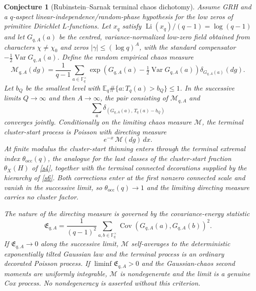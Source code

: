 \documentclass[11pt]{article}
\newtheorem{conjecture}{Conjecture}
\theoremstyle{definition}
\newcommand{\Li}{\operatorname{Li}}
\newcommand{\Var}{\operatorname{Var}}
\newcommand{\Cov}{\operatorname{Cov}}
\newcommand{\E}{\mathbb E}
\newcommand{\Fq}{\mathbb F}
\providecommand{\E}{\mathbb E}
\begin{document}
\begin{conjecture}[Rubinstein--Sarnak terminal chaos dichotomy]\label{s8}
Assume GRH and a $q$-aspect linear-independence/random-phase hypothesis for the low zeros
of primitive Dirichlet $L$-functions.  Let $x_q$ satisfy
$\Li(x_q)/(q-1)=\log(q-1)$ and let $G_{q,A}(a)$ be the centred, variance-normalized
low-zero field obtained from characters $\chi\ne\chi_0$ and zeros
$|\gamma|\le(\log q)^A$, with the standard compensator
$-\tfrac12\Var G_{q,A}(a)$.  Define the random empirical chaos measure
\[
 \mathcal M_{q,A}(dg)=\frac1{q-1}\sum_{a\in\Fq_q^\times}
  \exp\!\left(G_{q,A}(a)-\tfrac12\Var G_{q,A}(a)\right)
  \delta_{G_{q,A}(a)}(dg).
\]
Let $b_Q$ be the smallest level with $\E_q\#\{a:T_q(a)>b_Q\}\le1$.  In the successive limits
$Q\to\infty$ and then $A\to\infty$, the pair consisting of
$\mathcal M_{q,A}$ and
\[
 \sum_a\delta_{(G_{q,A}(a),\,T_q(a)-b_Q)}
\]
converges jointly.  Conditionally on the limiting chaos measure $\mathcal M$, the
terminal cluster-start process is Poisson with directing measure
\[
 e^{-x}\,\mathcal M(dg)\,dx.
\]
At finite modulus the cluster-start thinning enters through the terminal extremal
index $\theta_{\mathrm{occ}}(q)$, the analogue for the last classes of the
cluster-start fraction $\theta_X(H)$ of \cref{s4}, together with the terminal connected decorations supplied by the hierarchy of \cref{s6}.  Both corrections enter at the first
nonzero connected scale and vanish in the successive limit, so
$\theta_{\mathrm{occ}}(q)\to1$ and the limiting directing measure carries no
cluster factor.

The nature of the directing measure is governed by the covariance-energy statistic
\[
 \mathfrak E_{q,A}=\frac1{(q-1)^2}
 \sum_{a,b\in\Fq_q^\times}
 \Cov(G_{q,A}(a),G_{q,A}(b))^2.
\]
If $\mathfrak E_{q,A}\to0$ along the successive limit, $\mathcal M$ self-averages to the
deterministic exponentially tilted Gaussian law and the terminal process is an ordinary
decorated Poisson process.  If $\liminf\mathfrak E_{q,A}>0$ and the Gaussian-chaos
second moments are uniformly integrable, $\mathcal M$ is nondegenerate and the limit is
a genuine Cox process.  No nondegeneracy is asserted without this criterion.
\end{conjecture}
\end{document}
